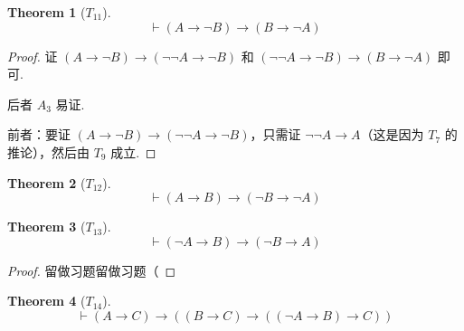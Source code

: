 \documentclass[oneside]{book}
\theoremstyle{definition}
\newtheorem{theorem}{Theorem}[section]
\begin{document}
\begin{theorem}[\(T_{11}\)]
	\[
	\vdash (A \to \neg B) \to (B \to \neg A)
	\]
\end{theorem}
\begin{proof}
	证 \( (A \to \neg B) \to (\neg \neg A \to \neg B) \) 和 \( (\neg \neg A \to \neg B) \to (B \to \neg A) \) 即可.
	
	后者 \( A_3 \) 易证.
	
	前者：要证 \( (A \to \neg B) \to (\neg \neg A \to \neg B) \)，只需证 \( \neg \neg A \to A \)（这是因为 \(T_7\) 的推论），然后由 \( T_9 \) 成立.
\end{proof}
\begin{theorem}[\(T_{12}\)]
	\[
	\vdash (A \to B) \to (\neg B \to \neg A)
	\]
\end{theorem}


\begin{theorem}[\(T_{13}\)]
	\[
	\vdash (\neg A \to B) \to (\neg B \to A)
	\]
\end{theorem}
\begin{proof}
	留做习题留做习题（
\end{proof}

\begin{theorem}[\(T_{14}\)]
	\[
	\vdash (A \to C) \to \left( (B \to C) \to ((\neg A \to B) \to C) \right)
	\]
\end{theorem}
\end{document}
